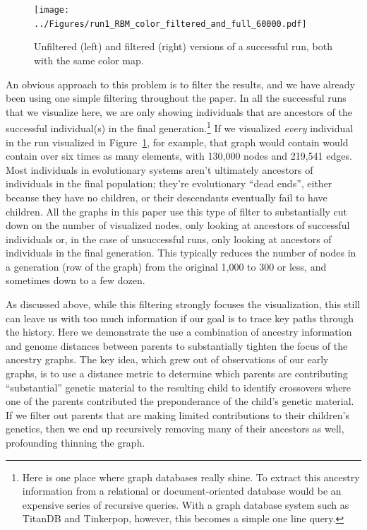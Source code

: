 \documentclass{sig-alternate}
\begin{document}
\begin{figure}[tb]
	\begin{center}
		\texttt{[image: ../Figures/run1\_RBM\_color\_filtered\_and\_full\_60000.pdf]}
	\end{center}
	\caption{Unfiltered (left) and filtered (right) versions of a successful run, both with the same color map.}
	\label{fig:lexRun1FilteredAndFull}
\end{figure}

An obvious approach to this problem is to filter the results, and we have
already been using one simple filtering throughout the paper. In all the
successful runs that we visualize here, we are only showing individuals that are
ancestors of the successful individual(s) in the final generation.\footnote{Here
	is one place where graph databases really shine. To extract this ancestry
	information from a relational or document-oriented database would be an
	expensive series of recursive queries. With a graph database system such as
	TitanDB and Tinkerpop, however, this becomes a simple one line query.} If we
visualized \emph{every} individual in the run visualized in
Figure~\ref{fig:lexRun1FilteredAndFull}, for example, that graph would contain
would contain over six times as many elements, with 130,000 nodes and 219,541
edges. Most individuals in evolutionary systems aren't ultimately ancestors of
individuals in the final population; they're evolutionary ``dead ends'', either
because they have no children, or their descendants eventually fail to have
children. All the graphs in this paper use this type of filter to substantially
cut down on the number of visualized nodes, only looking at ancestors of
successful individuals or, in the case of unsuccessful runs, only looking at
ancestors of individuals in the final generation. This typically reduces the
number of nodes in a generation (row of the graph) from the original 1,000 to
300 or less, and sometimes down to a few dozen.

As discussed above, while this filtering strongly focuses the visualization,
this still can leave us with too much information if our goal is to trace key
paths through the history. Here we demonstrate the use a combination of 
ancestry information and genome distances between parents to substantially 
tighten the focus of the ancestry graphs. The key idea, which grew out of 
observations of our early graphs, is to use a distance metric to determine 
which parents are contributing ``substantial'' genetic material to the 
resulting child to identify crossovers where one of the parents contributed the 
preponderance of the child's genetic material. If we filter out parents that 
are making limited contributions to their children's genetics, then we end up
recursively removing many of their ancestors as well, profounding thinning the
graph.
\end{document}
